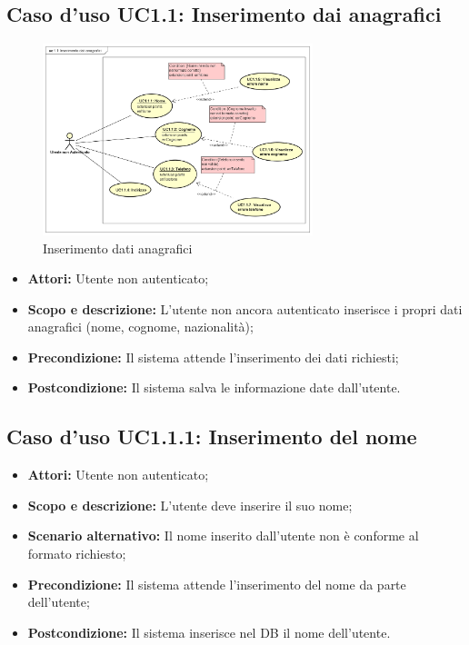\documentclass[12pt,a4paper,titlepage]{article}
\begin{document}
\subsection{Caso d'uso UC1.1: Inserimento dai anagrafici}
\begin{figure}[ht]
	\centering
	\includegraphics[width=0.7\textwidth]{UseCase/InserimentoDatiAnagrafici}
	\caption{Inserimento dati anagrafici}
\end{figure}
\begin{itemize}
	\item \textbf{Attori:} Utente non autenticato;
	\item \textbf{Scopo e descrizione:} L'utente non ancora autenticato inserisce i propri dati anagrafici (nome, cognome, nazionalità);
	\item \textbf{Precondizione:} Il sistema attende l'inserimento dei dati richiesti;
	\item \textbf{Postcondizione:} Il sistema salva le informazione date dall'utente.
\end{itemize}
\subsection{Caso d'uso UC1.1.1: Inserimento del nome}
\begin{itemize}
	\item \textbf{Attori:} Utente non autenticato; 
	\item \textbf{Scopo e descrizione:} L'utente deve inserire il suo nome;
	\item \textbf{Scenario alternativo:} Il nome inserito dall'utente non è conforme al formato richiesto;
	\item \textbf{Precondizione:} Il sistema attende l'inserimento del nome da parte dell'utente;
	\item \textbf{Postcondizione:} Il sistema inserisce nel DB il nome dell'utente.
\end{itemize}
\end{document}
